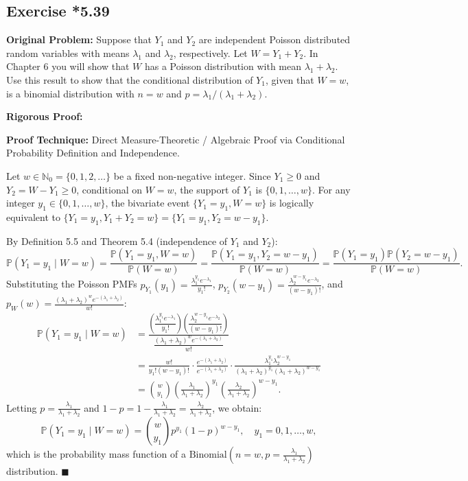 \documentclass[11pt, letterpaper]{article}
\theoremstyle{definition}
\theoremstyle{remark}
\newcommand{\Prob}{\mathbb{P}}
\begin{document}
\subsection{Exercise *5.39}

\textbf{Original Problem:}
Suppose that $Y_1$ and $Y_2$ are independent Poisson distributed random variables with means $\lambda_1$ and $\lambda_2$, respectively. Let $W = Y_1 + Y_2$. In Chapter 6 you will show that $W$ has a Poisson distribution with mean $\lambda_1 + \lambda_2$. Use this result to show that the conditional distribution of $Y_1$, given that $W = w$, is a binomial distribution with $n = w$ and $p = \lambda_1 / (\lambda_1 + \lambda_2)$.

\textbf{Rigorous Proof:}

\textbf{Proof Technique:} Direct Measure-Theoretic / Algebraic Proof via Conditional Probability Definition and Independence.

Let $w \in \mathbb{N}_0 = \{0, 1, 2, \dots\}$ be a fixed non-negative integer. Since $Y_1 \ge 0$ and $Y_2 = W - Y_1 \ge 0$, conditional on $W = w$, the support of $Y_1$ is $\{0, 1, \dots, w\}$. For any integer $y_1 \in \{0, 1, \dots, w\}$, the bivariate event $\{Y_1 = y_1, W = w\}$ is logically equivalent to $\{Y_1 = y_1, Y_1 + Y_2 = w\} = \{Y_1 = y_1, Y_2 = w - y_1\}$.

By Definition 5.5 and Theorem 5.4 (independence of $Y_1$ and $Y_2$):
\[ \Prob(Y_1 = y_1 \mid W = w) = \frac{\Prob(Y_1 = y_1, W = w)}{\Prob(W = w)} = \frac{\Prob(Y_1 = y_1, Y_2 = w - y_1)}{\Prob(W = w)} = \frac{\Prob(Y_1 = y_1)\Prob(Y_2 = w - y_1)}{\Prob(W = w)}. \]
Substituting the Poisson PMFs $p_{Y_1}(y_1) = \frac{\lambda_1^{y_1} e^{-\lambda_1}}{y_1!}$, $p_{Y_2}(w - y_1) = \frac{\lambda_2^{w - y_1} e^{-\lambda_2}}{(w - y_1)!}$, and $p_W(w) = \frac{(\lambda_1 + \lambda_2)^w e^{-(\lambda_1 + \lambda_2)}}{w!}$:
\begin{align*}
    \Prob(Y_1 = y_1 \mid W = w) &= \frac{\left(\dfrac{\lambda_1^{y_1} e^{-\lambda_1}}{y_1!}\right) \left(\dfrac{\lambda_2^{w - y_1} e^{-\lambda_2}}{(w - y_1)!}\right)}{\dfrac{(\lambda_1 + \lambda_2)^w e^{-(\lambda_1 + \lambda_2)}}{w!}} \\
    &= \frac{w!}{y_1! (w - y_1)!} \cdot \frac{e^{-(\lambda_1 + \lambda_2)}}{e^{-(\lambda_1 + \lambda_2)}} \cdot \frac{\lambda_1^{y_1} \lambda_2^{w - y_1}}{(\lambda_1 + \lambda_2)^{y_1} (\lambda_1 + \lambda_2)^{w - y_1}} \\
    &= \binom{w}{y_1} \left(\frac{\lambda_1}{\lambda_1 + \lambda_2}\right)^{y_1} \left(\frac{\lambda_2}{\lambda_1 + \lambda_2}\right)^{w - y_1}.
\end{align*}
Letting $p = \frac{\lambda_1}{\lambda_1 + \lambda_2}$ and $1 - p = 1 - \frac{\lambda_1}{\lambda_1 + \lambda_2} = \frac{\lambda_2}{\lambda_1 + \lambda_2}$, we obtain:
\[ \Prob(Y_1 = y_1 \mid W = w) = \binom{w}{y_1} p^{y_1} (1 - p)^{w - y_1}, \quad y_1 = 0, 1, \dots, w, \]
which is the probability mass function of a $\text{Binomial}\left(n = w, p = \frac{\lambda_1}{\lambda_1 + \lambda_2}\right)$ distribution. $\blacksquare$
\end{document}

